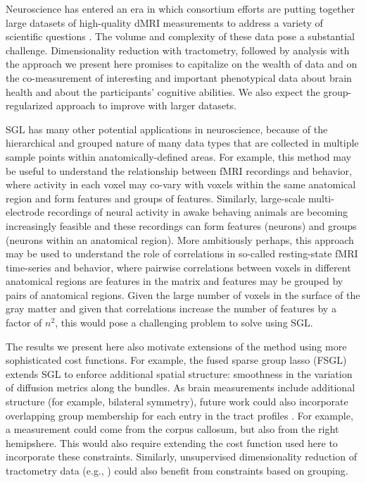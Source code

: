 Neuroscience has entered an era in which consortium efforts are putting together
large datasets of high-quality dMRI measurements to address a variety of
scientific questions \cite{jernigan2016ping, jernigan2018abcd,
alexander2017open, Miller2016-hw, VanEssen2012}. The volume and complexity of
these data pose a substantial challenge. Dimensionality reduction with
tractometry, followed by analysis with the approach we present here promises to
capitalize on the wealth of data and on the co-measurement of interesting and
important phenotypical data about brain health and about the participants'
cognitive abilities. We also expect the group-regularized approach to improve
with larger datasets.

SGL has many other potential applications in neuroscience, because
of the hierarchical and grouped nature of many data types that are
collected in multiple sample points within anatomically-defined areas.
For example, this method may be useful to understand the relationship
between fMRI recordings and behavior, where activity in each voxel
may co-vary with voxels within the same anatomical region and form
features and groups of features. Similarly, large-scale multi-electrode
recordings of neural activity in awake behaving animals are becoming
increasingly feasible \cite{steinmetz2018distributed, Jun2017-gv} and
these recordings can form features (neurons) and groups (neurons within
an anatomical region). More ambitiously perhaps, this approach may be
used to understand the role of correlations in so-called resting-state
fMRI time-series and behavior, where pairwise correlations between
voxels in different anatomical regions are features in the matrix and
features may be grouped by pairs of anatomical regions. Given the large
number of voxels in the surface of the gray matter and given that
correlations increase the number of features by a factor of $n^2$, this
would pose a challenging problem to solve using SGL.

The results we present here also motivate extensions of the method using more
sophisticated cost functions. For example, the fused sparse group lasso (FSGL)
\cite{zhou2012} extends SGL to enforce additional spatial structure: smoothness
in the variation of diffusion metrics along the bundles. As brain measurements
include additional structure (for example, bilateral symmetry), future work
could also incorporate overlapping group membership for each entry in the tract
profiles \cite{Rao2014-xm}. For example, a measurement could come from the
corpus callosum, but also from the right hemipshere. This would also require
extending the cost function used here to incorporate these constraints.
Similarly, unsupervised dimensionality reduction of tractometry data (e.g.,
\cite{Chamberland2019-mu}) could also benefit from constraints based on
grouping.

